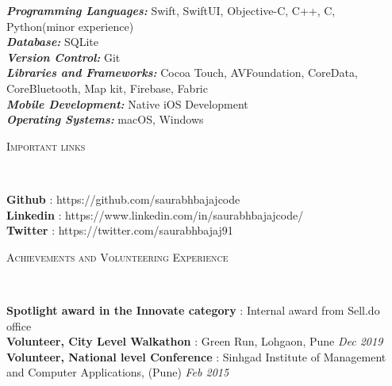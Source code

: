 \documentclass[9pt]{article}
\newenvironment{changemargin}[2]{%
  \begin{list}{}{%
    \setlength{\topsep}{0pt}%
    \setlength{\leftmargin}{#1}%
    \setlength{\rightmargin}{#2}%
    \setlength{\listparindent}{\parindent}%
    \setlength{\itemindent}{\parindent}%
    \setlength{\parsep}{\parskip}%
  }%
  \item[]}{\end{list}
}
\newcommand{\lineover}{
    \begin{changemargin}{-0.05in}{-0.05in}
        \vspace*{-8pt}
        \hrulefill \\
        \vspace*{-2pt}
    \end{changemargin}
}
\newcommand{\header}[1]{
    \begin{changemargin}{-0.5in}{-0.5in}
        \scshape{#1}\\
    \lineover
    \end{changemargin}
}
\newenvironment{body} {
    \vspace*{-16pt}
    \begin{changemargin}{-0.25in}{-0.5in}
  }
    {\end{changemargin}
}
\begin{document}
\begin{body}
    \vspace{14pt}
    \emph{\textbf{Programming Languages:}}{} Swift, SwiftUI, Objective-C, C++, C, Python(minor experience)\\
    \vspace*{2pt}
    \emph{\textbf{Database:}}{} SQLite\\
    \vspace*{2pt}
    \emph{\textbf{Version Control:}}{} Git\\
    \vspace*{2pt}
    \emph{\textbf{Libraries and Frameworks:}}{} Cocoa Touch, AVFoundation, CoreData, CoreBluetooth, Map kit,
Firebase, Fabric \\
\vspace*{2pt}
    \emph{\textbf{Mobile Development:}}{} Native iOS Development \\
    \vspace*{2pt}
    \emph{\textbf{Operating Systems:}}{} macOS, Windows\\
\end{body}

\smallskip
\smallskip
\smallskip
\smallskip


\header{Important links}

\begin{body}
    \vspace{14pt}
    \textbf{Github} : https://github.com/saurabhbajajcode \hfill{}\\
    \smallskip
    \textbf{Linkedin} : https://www.linkedin.com/in/saurabhbajajcode/ \hfill{}\\
    \smallskip
    \textbf{Twitter} : https://twitter.com/saurabhbajaj91 \hfill{}\\
\end{body}

\smallskip

\header{Achievements and Volunteering Experience}

\begin{body}
    \vspace{14pt}
    \textbf{Spotlight award in the Innovate category} : Internal award from Sell.do office\\
    \smallskip
    \textbf{Volunteer, City Level Walkathon} : Green Run, Lohgaon, Pune \hfill{} \emph{Dec 2019}\\
    \smallskip
    \textbf{Volunteer, National level Conference} : Sinhgad Institute of Management and Computer Applications, (Pune) \hfill {} \emph{Feb 2015}\\
\end{body}
\end{document}

